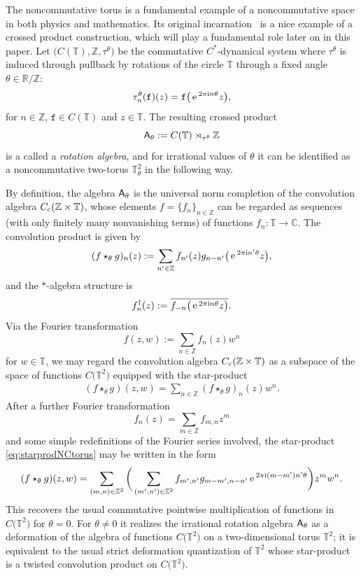 \documentclass[pdftex]{sigma}
\numberwithin{equation}{section}
\newcommand{\Z}{\zed}
\def\ii{{{\rm i}}}
\def\A{{\sf A}}
\newcommand{\complex}{{\mathbb C}} %
\newcommand{\zed}{{\mathbb Z}} %
\newcommand{\real}{{\mathbb R}} %
\newcommand{\torus}{{\mathbb T}} %
\def\e{{\,\rm e}\,}
\begin{document}
\begin{Example}\label{ex:NCtori}
The noncommutative torus is a fundamental example
of a noncommutative space in both physics and mathematics. Its
original incarnation~\cite{Rieffel1981} is a nice example of a crossed
product construction, which will play a fundamental role later on in this
paper. Let $\big(C(\torus),\Z,\tau^\theta\big)$ be the commutative $C^*$-dynamical system
where $\tau^\theta$ is induced through pullback by rotations of the circle $\torus$ through
a fixed angle $\theta\in\real/\Z$:
\[
\tau^\theta_n(\mathtt{f})(z) = \mathtt{f}\big(\e^{2\pi\ii n \theta} z\big) ,
\]
for $n\in\Z$, $\mathtt{f}\in C(\torus)$ and $z\in\torus$. The resulting crossed
product
\[
\A_\theta:=C(\torus)\rtimes_{\tau^\theta}\Z
\]
is a called a \emph{rotation
algebra}, and for irrational values of $\theta$ it can be identified as a noncommutative two-torus
$\torus_\theta^2$ in the following way.

By definition, the algebra
$\A_\theta$ is the universal norm completion of the convolution
algebra $C_{\rm c}(\Z\times\torus)$, whose elements $f=\{f_n\}_{n\in\Z}$ can be regarded as
sequences (with only finitely many nonvanishing
terms) of functions $f_n\colon \torus\to\complex$. The convolution product is
given by
\[
(f\star_\theta g)_n(z) := \sum_{n'\in\Z} f_{n'}(z) g_{n-n'}\big(\e^{2\pi\ii n' \theta} z\big) ,
\]
and the $*$-algebra structure is
\[
f^\dag_n(z):=\overline{f_{-n}\big(\e^{2\pi\ii n \theta} z\big)} .
\]
Via the Fourier transformation
\[
f(z,w) := \sum_{n\in\Z} f_{n}(z) w^n
\]
for $w\in\torus$, we may regard the convolution algebra $C_{\rm
 c}(\Z\times\torus)$ as a subspace of the space of functions $C\big(\torus^2\big)$ equipped
with the star-product
\begin{gather}\label{eq:starprodNCtorus}
(f\star_\theta g)(z,w) = \sum_{n\in\Z} (f\star_\theta g)_n(z) w^n .
\end{gather}
After a further Fourier transformation
\[
f_n(z) = \sum_{m\in\Z} f_{m,n} z^m
\]
and some simple redefinitions of the Fourier series involved, the
star-product \eqref{eq:starprodNCtorus} may be written in the form
\[
(f\star_\theta g)(z,w) = \sum_{(m,n)\in\Z^2}
\bigg(\sum_{(m',n')\in\Z^2} f_{m',n'} g_{m-m',n-n'}
\e^{2\pi\ii (m-m') n' \theta}\bigg) z^m w^n .
\]
This recovers the usual commutative pointwise multiplication of functions in
$C\big(\torus^2\big)$ for $\theta=0$. For $\theta\neq0$ it realizes the irrational rotation algebra $\A_\theta$ as a
deformation of the algebra of functions $C\big(\torus^2\big)$ on a
two-dimensional torus $\torus^2$; it is equivalent to the usual strict
deformation quantization of $\torus^2$ whose star-product is a twisted
convolution product on $C\big(\torus^2\big)$.


\end{Example}
\end{document}
